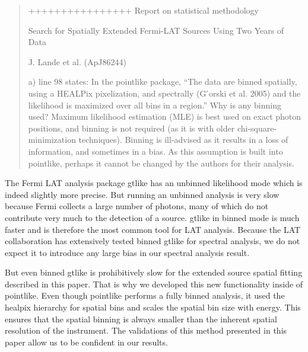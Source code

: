 \documentclass{article}
\newenvironment{referee}
{\begin{quote}\color{red}}
  {\end{quote}}
\newenvironment{reply}
  {}
  {}
\begin{document}
\begin{referee}
++++++++++++++++
Report on statistical methodology

Search for Spatially Extended Fermi-LAT Sources Using Two Years of Data

J. Lande et al. (ApJ86244)

a) line 98 states: In the pointlike package, ``The data are binned
spatially, using a HEALPix pixelization, and spectrally (G ́orski et
al. 2005) and the likelihood is maximized over all bins in a region.'' Why
is any binning used? Maximum likelihood estimation (MLE) is best used
on exact photon positions, and binning is not required (as it is with
older chi-square-minimization techniques). Binning is ill-advised as
it results in a loss of information, and sometimes in a bias. As this
assumption is built into pointlike, perhaps it cannot be changed by the
authors for their analysis.
\end{referee}


\begin{reply}
The Fermi LAT analysis package gtlike has an unbinned likelihood mode
which is indeed slightly more precise. But running an unbinned analysis
is very slow because Fermi collects a large number of photons, many of
which do not contribute very much to the detection of a source. gtlike
in binned mode is much faster and is therefore the most common tool
for LAT analysis. Because the LAT collaboration has extensively tested
binned gtlike for spectral analysis, we do not expect it to introduce
any large bias in our spectral analysis result.

But even binned gtlike is prohibitively slow for the extended source
spatial fitting described in this paper. That is why we developed this
new functionality inside of pointlike. 
Even though pointlike performs a fully binned analysis, it used the
healpix hierarchy for spatial bins and scales the spatial bin size with
energy. This ensures that the spatial binning is always smaller than the
inherent spatial resolution of the instrument.
The validations of this method
presented in this paper allow us to be confident in our results.
\end{reply}
\end{document}
